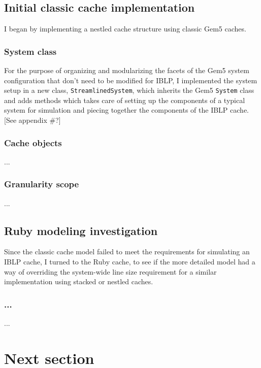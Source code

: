 \documentclass[12pt,twoside]{reedthesis}
\newcommand{\vrb}[1]{\Verb!#1!}
\begin{document}
\section{Initial classic cache implementation}

	I began by implementing a nestled cache structure using classic Gem5 caches.

	\subsection*{System class}
	For the purpose of organizing and modularizing the facets of the Gem5 system configuration that don't need to be modified for IBLP, I implemented the system setup in a new class, \vrb{StreamlinedSystem}, which inherits the Gem5 \vrb{System} class and adds methods which takes care of setting up the components of a typical system for simulation and piecing together the components of the IBLP cache. [See appendix \#?]

	\subsection*{Cache objects}

	...

	\subsection*{Granularity scope}

	...

\section{Ruby modeling investigation}

	Since the classic cache model failed to meet the requirements for simulating an IBLP cache, I turned to the Ruby cache, to see if the more detailed model had a way of overriding the system-wide line size requirement for a similar implementation using stacked or nestled caches.

	\subsection*{...}

	...


\chapter{Next section}
\end{document}
